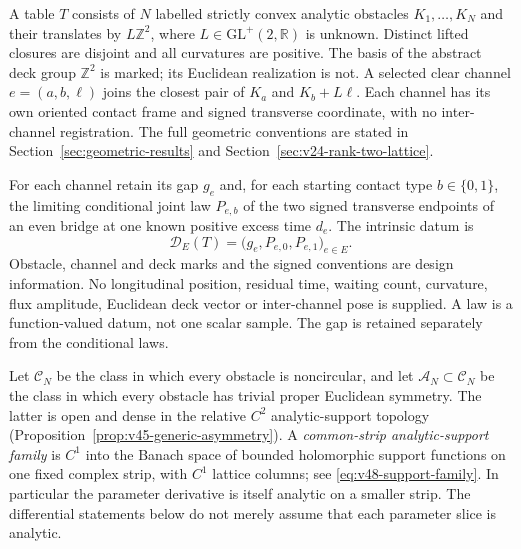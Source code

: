A table $T$ consists of $N$ labelled strictly convex analytic obstacles
$K_1,\ldots,K_N$ and their translates by $L\mathbb Z^2$, where
$L\in\mathrm{GL}^+(2,\mathbb R)$ is unknown.  Distinct lifted closures
are disjoint and all curvatures are positive.  The basis of the abstract
deck group $\mathbb Z^2$ is marked; its Euclidean realization is not.
A selected clear channel $e=(a,b,\ell)$ joins the closest pair of
$K_a$ and $K_b+L\ell$.  Each channel has its own oriented contact frame
and signed transverse coordinate, with no inter-channel registration.
The full geometric conventions are stated in
Section~\ref{sec:geometric-results} and
Section~\ref{sec:v24-rank-two-lattice}.

For each channel retain its gap $g_e$ and, for each starting contact type
$b\in\{0,1\}$, the limiting conditional joint law $P_{e,b}$ of the two
signed transverse endpoints of an even bridge at one known positive
excess time $d_e$.  The intrinsic datum is
\begin{equation}\label{eq:v48-datum}
       \mathcal D_E(T)=\bigl(g_e,P_{e,0},P_{e,1}\bigr)_{e\in E}.
\end{equation}
Obstacle, channel and deck marks and the signed conventions are design
information.  No longitudinal position, residual time, waiting count,
curvature, flux amplitude, Euclidean deck vector or inter-channel pose
is supplied.  A law is a function-valued datum, not one scalar sample.
The gap is retained separately from the conditional laws.

Let $\mathscr C_N$ be the class in which every obstacle is noncircular,
and let $\mathscr A_N\subset\mathscr C_N$ be the class in which every
obstacle has trivial proper Euclidean symmetry.  The latter is open and
dense in the relative $C^2$ analytic-support topology
(Proposition~\ref{prop:v45-generic-asymmetry}).  A
\emph{common-strip analytic-support family} is $C^1$ into the Banach space
of bounded holomorphic support functions on one fixed complex strip,
with $C^1$ lattice columns; see \eqref{eq:v48-support-family}.
In particular the parameter derivative is itself analytic on a smaller
strip.  The differential statements below do not merely assume that
each parameter slice is analytic.

